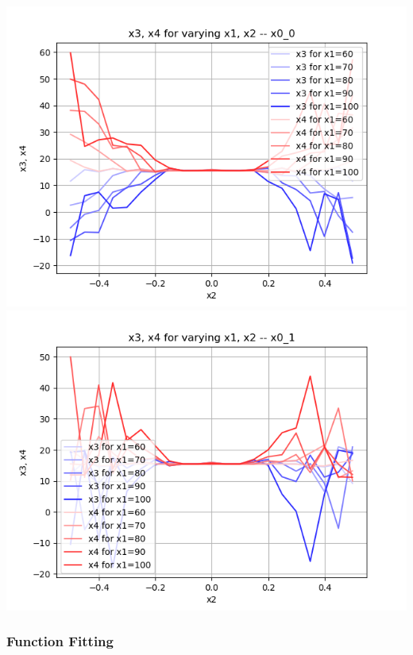 \documentclass[10pt,a4paper]{article}
\begin{document}
\includegraphics[width=.45\textwidth]{pics/model_3/X3-X4_-_x0_0_-_2D.png}
\includegraphics[width=.45\textwidth]{pics/model_3/X3-X4_-_x0_1_-_2D.png}


\subsubsection{Function Fitting}
\end{document}
